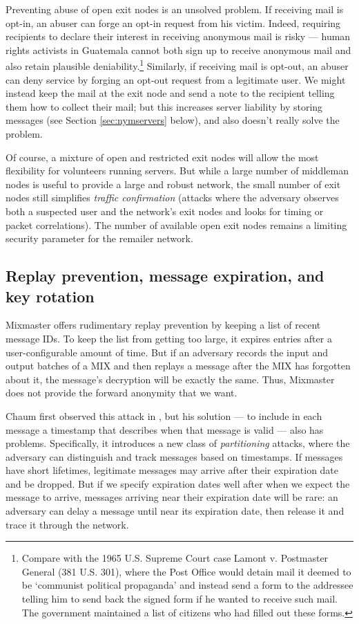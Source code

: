 \documentclass{llncs}
\begin{document}
Preventing abuse of open exit nodes is an unsolved problem. If
receiving mail is opt-in, an abuser can forge an opt-in request from
his victim. Indeed, requiring recipients to declare their interest
in receiving anonymous mail is risky --- human rights activists in
Guatemala cannot both sign up to receive anonymous mail and also retain
plausible deniability.\footnote{
  Compare with the 1965 U.S. Supreme Court case Lamont v. Postmaster
  General (381 U.S. 301), where the Post Office would detain mail it
  deemed to be `communist political propaganda' and instead send a form
  to the addressee telling him to send back the signed form if he wanted
  to receive such mail. The government maintained a list of citizens
  who had filled out these forms.
} Similarly, if receiving mail is opt-out, an abuser can deny service
by forging an opt-out request from a legitimate user. We might instead
keep the mail at the exit node and send a note to the recipient
telling them how to collect their mail; but this increases
server liability by storing messages (see Section \ref{sec:nymservers}
below), and also doesn't really solve the problem.

Of course, a mixture of open and restricted exit nodes will allow the
most flexibility for volunteers running servers. But while a large number
of middleman nodes is useful to provide a large and robust network, the
small number of exit nodes still simplifies \emph{traffic confirmation}
(attacks where the adversary observes both a suspected user and the
network's exit nodes and looks for timing or packet correlations). The
number of available open exit nodes remains a limiting security parameter
for the remailer network.

\subsection{Replay prevention, message expiration, and key rotation}

Mixmaster offers rudimentary replay prevention by keeping a list of recent
message IDs. To keep the list from getting too large, it expires entries
after a user-configurable amount of time. But if an adversary records
the input and output batches of a MIX and then replays a message after
the MIX has forgotten about it, the message's decryption will be exactly
the same. Thus, Mixmaster does not provide the forward anonymity that we want.

Chaum first observed this attack in \cite{chaum-mix}, but his solution
--- to include in each message a timestamp that describes when that message
is valid --- also has problems. Specifically, it introduces a new class
of \emph{partitioning} attacks, where the adversary can distinguish and
track messages based on timestamps. If messages have short lifetimes,
legitimate messages may arrive after their expiration date and be
dropped. But if we specify expiration dates well after when we expect the
message to arrive, messages arriving near their expiration date will be
rare: an adversary can delay a message until near its expiration date,
then release it and trace it through the network.
\end{document}

